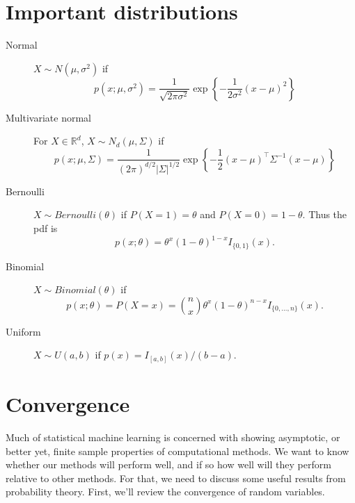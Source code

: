 \documentclass[10pt]{article}
\newcommand{\R}{\mathbb{R}}
\begin{document}
\section{Important distributions}
\label{sec:import-distr}

\begin{description}
\item[Normal] $X\sim N(\mu,\sigma^2)$ if
  \begin{equation}
    \label{eq:7}
    p(x;\mu,\sigma^2) =
    \frac{1}{\sqrt{2\pi\sigma^2}}\exp\left\{-\frac{1}{2\sigma^2}(x-\mu)^2\right\} 
  \end{equation}
\item[Multivariate normal] For $X\in \R^d$, $X\sim N_d(\mu, \Sigma)$ if
  \begin{equation}
    \label{eq:15}
    p(x;\mu,\Sigma) = \frac{1}{(2\pi)^{d/2}|\Sigma|^{1/2}}\exp\left\{-\frac{1}{2}(x-\mu)^\top\Sigma^{-1}(x-\mu)\right\} 
  \end{equation}
\item[Bernoulli] $X\sim Bernoulli(\theta)$ if $P(X=1)=\theta$ and
  $P(X=0) = 1-\theta$. Thus the pdf is
  \begin{equation}
    \label{eq:16}
    p(x;\theta) = \theta^x(1-\theta)^{1-x} I_{\{0,1\}}(x).
  \end{equation}
\item[Binomial] $X\sim Binomial(\theta)$ if
  \begin{equation}
    \label{eq:17}
    p(x;\theta) = P(X=x) = \binom{n}{x}\theta^x(1-\theta)^{n-x}I_{\{0,\ldots,n\}}(x).
  \end{equation}
\item[Uniform] $X\sim U(a,b)$ if $p(x) = I_{[a,b]}(x)/(b-a).$
\end{description}



\section{Convergence}
\label{sec:convergence}

Much of statistical machine learning is concerned with showing
asymptotic, or better yet, finite sample properties of computational
methods. We want to know whether our methods will perform well, and if
so how well will they perform relative to other methods. For that, we
need to discuss some useful results from probability theory. First,
we'll review the convergence of random variables.
\end{document}
